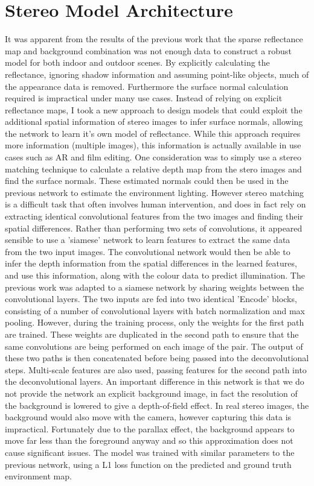 \documentclass[ %
                    author={Gavin Parker},
                supervisor={Dr. Neill Campbell},
                    degree={MEng},
                     title={Deep Siamese Networks for Illumination Estimation from Stereo Images},
                  subtitle={},
                      type={research},
                      year={2018} ]{dissertation}
\begin{document}
\section{Stereo Model Architecture}
It was apparent from the results of the previous work that the sparse reflectance map and background combination was not enough data to construct a robust model for both indoor and outdoor scenes. By explicitly calculating the reflectance, ignoring shadow information and assuming point-like objects, much of the appearance data is removed. Furthermore the surface normal calculation required is impractical under many use cases. Instead of relying on explicit reflectance maps, I took a new approach to design models that could exploit the additional spatial information of stereo images to infer surface normals, allowing the network to learn it's own model of reflectance. While this approach requires more information (multiple images), this information is actually available in use cases such as AR and film editing. One consideration was to simply use a stereo matching technique to calculate a relative depth map from the stero images and find the surface normals. These estimated normals could then be used in the previous network to estimate the environment lighting. However stereo matching is a difficult task that often involves human intervention, and does in fact rely on extracting identical convolutional features from the two images and finding their spatial differences.  Rather than performing two sets of convolutions, it appeared sensible to use a 'siamese' network to learn features to extract the same data from the two input images. The convolutional network would then be able to infer the depth information from the spatial differences in the learned features, and use this information, along with the colour data to predict illumination.
\newline
The previous work was adapted to a siamese network by sharing weights between the convolutional layers. The two inputs are fed into two identical 'Encode' blocks, consisting of a number of convolutional layers with batch normalization and max pooling. However, during the training process, only the weights for the first path are trained. These weights are duplicated in the second path to ensure that the same convolutions are being performed on each image of the pair. The output of these two paths is then concatenated before being passed into the deconvolutional steps. Multi-scale features are also used, passing features for the second path into the deconvolutional layers. An important difference in this network is that we do not provide the network an explicit background image, in fact the resolution of the background is lowered to give a depth-of-field effect. In real stereo images, the background would also move with the camera, however capturing this data is impractical. Fortunately due to the parallax effect, the background appears to move far less than the foreground anyway and so this approximation does not cause significant issues. The model was trained with similar parameters to the previous network, using a L1 loss function on the predicted and ground truth environment map.
\end{document}
